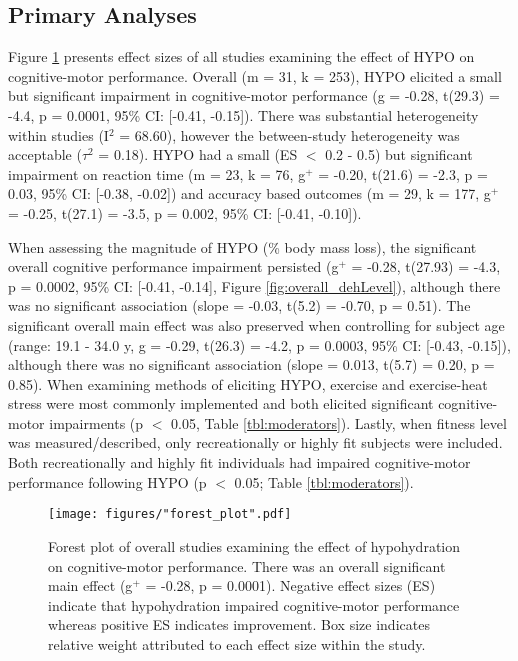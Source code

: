 \subsection{Primary Analyses}
Figure \ref{fig:forest_plot} presents effect sizes of all studies examining the effect of HYPO on cognitive-motor performance. Overall (m = 31, k = 253), HYPO elicited a small but significant impairment in cognitive-motor performance (g = -0.28, t(29.3) = -4.4, p = 0.0001, 95\% CI: [-0.41, -0.15]). There was substantial heterogeneity within studies (I${^2}$ = 68.60), however the between-study heterogeneity was acceptable (${\tau}$${^2}$ = 0.18). HYPO had a small (ES $<$ 0.2 - 0.5) but significant impairment on reaction time (m = 23, k = 76, g${^+}$ = -0.20, t(21.6) = -2.3, p = 0.03, 95\% CI: [-0.38, -0.02]) and accuracy based outcomes (m = 29, k = 177, g${^+}$ = -0.25, t(27.1) = -3.5, p = 0.002, 95\% CI: [-0.41, -0.10]).

When assessing the magnitude of HYPO (\% body mass loss), the significant overall cognitive performance impairment persisted (g${^+}$ = -0.28, t(27.93) = -4.3, p = 0.0002, 95\% CI: [-0.41, -0.14], Figure \ref{fig:overall_dehLevel}), although there was no significant association (slope = -0.03, t(5.2) = -0.70, p = 0.51). The significant overall main effect was also preserved when controlling for subject age (range: 19.1 - 34.0 y, g = -0.29, t(26.3) = -4.2, p = 0.0003, 95\% CI: [-0.43, -0.15]), although there was no significant association (slope = 0.013, t(5.7) = 0.20, p = 0.85). When examining methods of eliciting HYPO, exercise and exercise-heat stress were most commonly implemented and both elicited significant cognitive-motor impairments (p $<$ 0.05, Table \ref{tbl:moderators}). Lastly, when fitness level was measured/described, only recreationally or highly fit subjects were included. Both recreationally and highly fit individuals had impaired cognitive-motor performance following HYPO (p ${<}$ 0.05; Table \ref{tbl:moderators}).  

\begin{figure}
	\centering
	\texttt{[image: figures/"forest\_plot".pdf]}
	\caption{Forest plot of overall studies examining the effect of hypohydration on cognitive-motor performance. There was an overall significant main effect (g${^+}$ = -0.28, p = 0.0001). Negative effect sizes (ES) indicate that hypohydration impaired cognitive-motor performance whereas positive ES indicates improvement. Box size indicates relative weight attributed to each effect size within the study.}
	\label{fig:forest_plot}
\end{figure}

